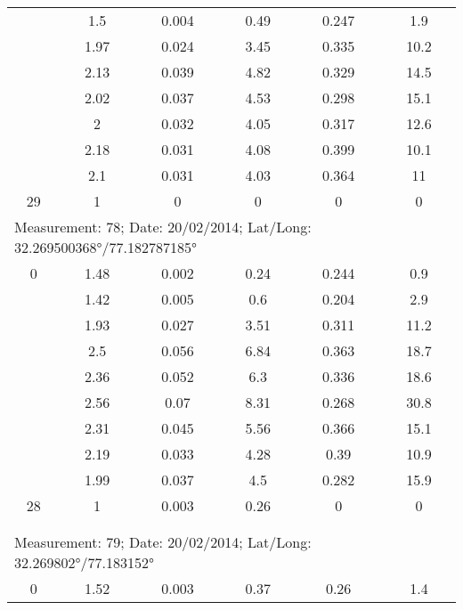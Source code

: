 \begin{longtable}{cccccc}
		& 1.5   & 0.004 & 0.49  & 0.247 & 1.9 \\
		
		& 1.97  & 0.024 & 3.45  & 0.335 & 10.2 \\
		
		& 2.13  & 0.039 & 4.82  & 0.329 & 14.5 \\
		
		& 2.02  & 0.037 & 4.53  & 0.298 & 15.1 \\
		
		& 2     & 0.032 & 4.05  & 0.317 & 12.6 \\
		
		& 2.18  & 0.031 & 4.08  & 0.399 & 10.1 \\
		
		& 2.1   & 0.031 & 4.03  & 0.364 & 11 \\
		
		29    & 1     & 0     & 0     & 0     & 0 \\
		\midrule
		\multicolumn{6}{l}{Measurement: 78; Date: 20/02/2014;
			Lat/Long: 32.269500368°/77.182787185°} \\		
		\midrule
		0     & 1.48  & 0.002 & 0.24  & 0.244 & 0.9 \\
		
		& 1.42  & 0.005 & 0.6   & 0.204 & 2.9 \\
		
		& 1.93  & 0.027 & 3.51  & 0.311 & 11.2 \\
		
		& 2.5   & 0.056 & 6.84  & 0.363 & 18.7 \\
		
		& 2.36  & 0.052 & 6.3   & 0.336 & 18.6 \\
		
		& 2.56  & 0.07  & 8.31  & 0.268 & 30.8 \\
		
		& 2.31  & 0.045 & 5.56  & 0.366 & 15.1 \\
		
		& 2.19  & 0.033 & 4.28  & 0.39  & 10.9 \\
		
		& 1.99  & 0.037 & 4.5   & 0.282 & 15.9 \\
		
		28    & 1     & 0.003 & 0.26  & 0     & 0 \\ \\ \\
		\multicolumn{6}{l}{Measurement: 79; Date: 20/02/2014;
			Lat/Long: 32.269802°/77.183152°} \\		
		\midrule
		0     & 1.52  & 0.003 & 0.37  & 0.26  & 1.4 \\
		

\end{longtable}
